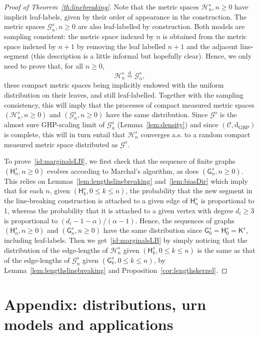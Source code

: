 \documentclass[10pt]{amsart}
\theoremstyle{definition}\newtheorem{defi}[theo]{Definition}\newtheorem{rema}[theo]{Remark}\newtheorem{exam}[theo]{Example}\newtheorem{exem}[theo]{Example}\newtheorem{nota}[theo]{Notation}
\newcommand{\GHP}{\mathrm{GHP}}
\newcommand{\rmd}{\mathrm{d}}
\newcommand{\cG}{\mathcal{G}}
\newcommand{\cH}{\mathcal{H}}
\newcommand{\sG}{\mathsf{G}}
\newcommand{\sK}{\mathsf{K}}
\newcommand{\sH}{\mathsf{H}}
\newcommand{\scrC}{\mathscr{C}}
\begin{document}
\begin{proof}[Proof of Theorem~\ref{th:linebreaking}]
Note that the metric spaces $\cH^s_n,n\geq 0$ have implicit leaf-labels, given by their order of appearance in the construction. The metric spaces $\cG^s_n,n\geq 0$ are also leaf-labelled by construction. Both models are sampling consistent: the metric space indexed by $n$ is obtained from the metric space indexed by $n+1$ by removing the leaf labelled $n+1$ and the adjacent line-segment (this description is a little informal but hopefully clear). Hence, we only need to prove that, for all $n \geq 0$,
\begin{equation}\label{id:marginalsLB}
\cH^s_n \overset{\rmd}= {\cG}^s_n,
\end{equation}
these compact metric spaces being implicitly endowed with the uniform distribution on their leaves, and still leaf-labelled. Together with the sampling consistency, this will imply that the processes of compact measured metric spaces $(\cH^s_n,n\geq 0)$ and $(\cG^s_n,n\geq 0)$ have the same distribution. Since $\cG^s$ is the almost sure GHP-scaling limit of $\cG^s_n$ (Lemma~\ref{lem:density}) and since $(\scrC,\rmd_{\GHP})$ is complete, this will in turn entail that $\cH^s_n$ converges a.s. to a random compact measured metric space distributed as $\cG^s$.

To prove~\eqref{id:marginalsLB}, we first check that the sequence of finite graphs $(\sH^s_n,n\geq 0)$ evolves according to Marchal's algorithm, as does $(\sG^s_n,n\geq 0)$. This relies on Lemmas~\ref{lem:lengthslinebreaking} and~\ref{lem:biasDir} which imply that for each $n$, given $(\sH^s_k, 0\leq k \leq n)$, the probability that the new segment in the line-breaking construction is attached to a given edge of $\sH^s_n$ is proportional to 1, whereas the probability that it is attached to a given vertex with degree $d_i\geq 3$ is proportional to $(d_i-1-\alpha)/(\alpha-1)$. Hence, the sequences of graphs $(\sH^s_n,n \geq 0)$ and $({\sG}^s_n, n \geq 0)$ have the same distribution since $\sG_0^s=\sH_0^s=\sK^s$, including leaf-labels. Then we get~\eqref{id:marginalsLB} by simply noticing that the distribution of the edge-lengths of $\cH^s_n$ given $(\sH^s_k,0\leq k \leq n)$ is the same as that of the edge-lengths of ${\cG}^s_n$ given $(\sG^s_k,0\leq k \leq n)$, by Lemma~\ref{lem:lengthslinebreaking} and Proposition~\ref{cor:lengthskernel}.
\end{proof}

\section{Appendix: distributions, urn models and applications}\label{sec:urns}
\end{document}
